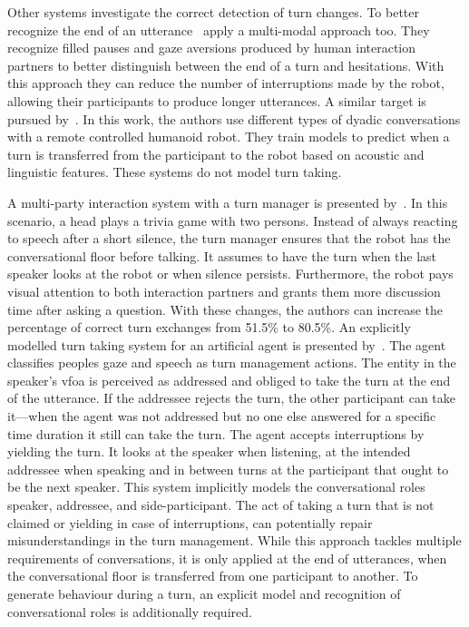 Other systems investigate the correct detection of \gls{turn} changes.
To better recognize the end of an utterance~ apply a multi-modal approach too.
They recognize filled pauses and gaze aversions produced by human interaction partners to better distinguish between the end of a \gls{turn} and hesitations.
With this approach they can reduce the number of interruptions made by the \gls{robot}, allowing their participants to produce longer utterances.
A similar target is pursued by~.
In this work, the authors use different types of dyadic \glspl{conversation} with a remote controlled humanoid \gls{robot}.
They train models to predict when a \gls{turn} is transferred from the participant to the \gls{robot} based on acoustic and linguistic features.
These systems do not model \gls{turn taking}.

A multi-party interaction system with a \gls{turn} manager is presented by~.
In this scenario, a  head plays a trivia game with two persons.
Instead of always reacting to speech after a short silence, the \gls{turn} manager ensures that the \gls{robot} has the \gls{conversational floor} before talking.
It assumes to have the \gls{turn} when the last \gls{speaker} looks at the \gls{robot} or when silence persists.
Furthermore, the \gls{robot} pays visual attention to both interaction partners and grants them more discussion time after asking a question.
With these changes, the authors can increase the percentage of correct \gls{turn} exchanges from 51.5\% to 80.5\%.
An explicitly modelled \gls{turn taking system} for an \gls{artificial agent} is presented by~.
The agent classifies peoples gaze and speech as \gls{turn} management actions.
The entity in the \gls{speaker}'s \gls{vfoa} is perceived as addressed and obliged to take the \gls{turn} at the end of the utterance.
If the \gls{addressee} rejects the \gls{turn}, the other participant can take it---when the agent was not addressed but no one else answered for a specific time duration it still can take the \gls{turn}.
The agent accepts interruptions by yielding the \gls{turn}.
It looks at the \gls{speaker} when listening, at the intended \gls{addressee} when speaking and in between \glspl{turn} at the participant that ought to be the next \gls{speaker}.
This system implicitly models the \glspl{conversational role} \gls{speaker}, \gls{addressee}, and \gls{side-participant}.
The act of taking a \gls{turn} that is not claimed or yielding in case of interruptions, can potentially repair misunderstandings in the \gls{turn} management.
While this approach tackles multiple requirements of \glspl{conversation}, it is only applied at the end of utterances, when the \gls{conversational floor} is transferred from one participant to another.
To generate behaviour during a \gls{turn}, an explicit model and recognition of \glspl{conversational role} is additionally required.

